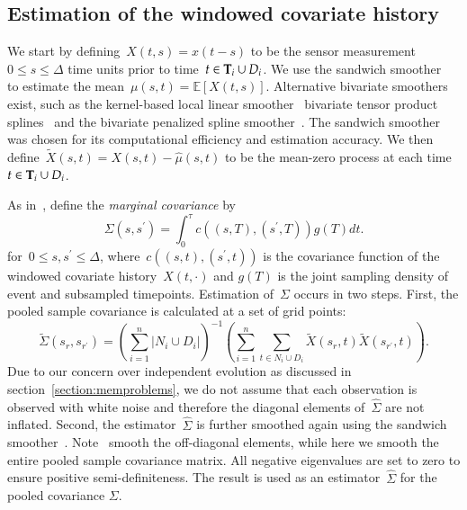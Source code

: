 \documentclass[12pt]{amsart}
\def\E{\mathcal{E}}
\def\E{\mathbb{E}}
\def\bfT{{\bf T}}
\begin{document}
\subsection{Estimation of the windowed covariate history}

We start by defining~$X(t,s) = x(t-s)$ to be the sensor measurement~$0
\leq s \leq \Delta$ time units prior to time~$t \in \bfT_i \cup D_i$.
We use the sandwich smoother~\citep{Xiao2013} to estimate the
mean~$\mu(s,t) = \E [ X(t,s)]$.
Alternative bivariate smoothers exist, such as the kernel-based local
linear smoother~\citep{Hastie2009} bivariate tensor product
splines~\citep{Wood2006} and the bivariate penalized spline
smoother~\citep{MarxEilers2005}.
The sandwich smoother was chosen for its computational efficiency and
estimation accuracy.
We then define~$\tilde X(s,t) = X(s,t) - \hat \mu(s,t)$ to be the
mean-zero process at each time~$t \in \bfT_i \cup D_i$.

As in~\cite{Park2018}, define the \emph{marginal covariance} by
\[
\Sigma (s, s^\prime) = \int_{0}^\tau c( (s,T), (s^\prime, T) ) g(T) dt.
\]
for~$0 \leq s,s^\prime \leq \Delta$, where~$c((s,t), (s^\prime,t))$ is
the covariance function of the windowed covariate history~$X(t,\cdot)$
and $g(T)$ is the joint sampling density of event and subsampled
timepoints. 
Estimation of~$\Sigma$ occurs in two steps. 
First, the pooled sample covariance is calculated at a set of grid
points:
\[
\tilde \Sigma (s_r , s_{r^\prime}) = \left( \sum_{i=1}^n \left | N_i 
    \cup D_i \right |\right)^{-1} \left( \sum_{i=1}^n \sum_{t \in N_i
    \cup D_i} \tilde X (s_r,t) \tilde X (s_{r^\prime}, t) \right).
\]
Due to our concern over independent evolution as discussed in
section~\ref{section:memproblems}, we do not assume that each
observation is observed with white noise and therefore the diagonal
elements of~$\hat \Sigma$ are not inflated. Second, the
estimator~$\hat \Sigma$ is further smoothed again using the sandwich 
smoother~\citep{Xiao2013}. 
Note~\cite{Park2018} smooth the off-diagonal elements, while here we
smooth the entire pooled sample covariance matrix. All negative
eigenvalues are set to zero to ensure positive semi-definiteness.
The result is used as an estimator~$\hat \Sigma$ for the pooled
covariance $\Sigma$.
\end{document}
